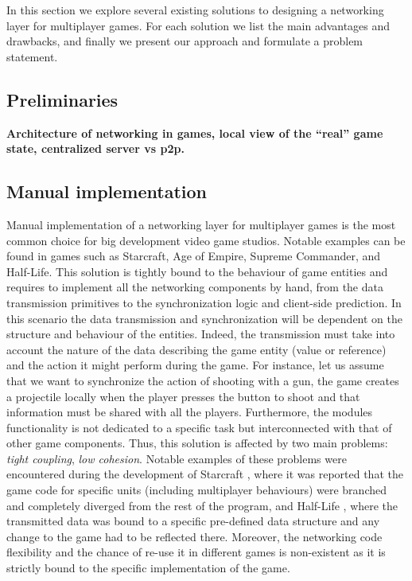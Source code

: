 In this section we explore several existing solutions to designing a networking layer for multiplayer games. For each solution we list the main advantages and drawbacks, and finally we present our approach and formulate a problem statement.

\subsection{Preliminaries}
\textbf{Architecture of networking in games, local view of the ``real'' game state, centralized server vs p2p.
}
\subsection{Manual implementation}
Manual implementation of a networking layer for multiplayer games is the most common choice for big development video game studios. Notable examples can be found in games such as Starcraft, Age of Empire, Supreme Commander, and Half-Life. This solution is tightly bound to the behaviour of game entities and requires to implement all the networking components by hand, from the data transmission primitives to the synchronization logic and client-side prediction. In this scenario the data transmission and synchronization will be dependent on the structure and behaviour of the entities. Indeed, the transmission must take into account the nature of the data describing the game entity (value or reference) and the action it might perform during the game. For instance, let us assume that we want to synchronize the action of shooting with a gun, the game creates a projectile locally when the player presses the button to shoot and that information must be shared with all the players. Furthermore, the modules functionality is not dedicated to a specific task but interconnected with that of other game components. Thus, this solution is affected by two main problems: \textit{tight coupling}, \textit{low cohesion}. Notable examples of these problems were encountered during the development of Starcraft \cite{starcraft}, where it was reported that the game code for specific units (including multiplayer behaviours) were branched and completely diverged from the rest of the program, and Half-Life \cite{bernier2001latency}, where the transmitted data was bound to a specific pre-defined data structure and any change to the game had to be reflected there. Moreover, the networking code flexibility and the chance of re-use it in different games is non-existent as it is strictly bound to the specific implementation of the game.

